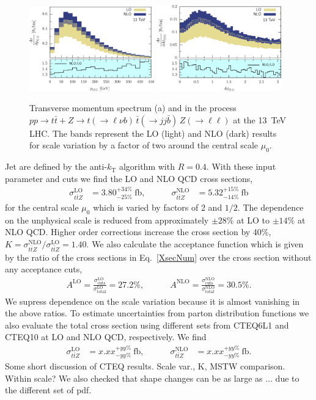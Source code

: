 \documentclass[preprint]{JHEP3} %
\def\ttb{t\bar{t}}
\newcommand{\be}{\begin{eqnarray}}
\newcommand{\ee}{\end{eqnarray}}
\begin{document}
\begin{figure}[t]
\centering %
\includegraphics[width=0.48\textwidth]{./LHC_53_Fig12.eps}
\includegraphics[width=0.48\textwidth]{./LHC_53_Fig17.eps}
\caption{\label{fig:i} Transverse momentum spectrum (a) and 
in the process $pp \to \ttb + Z \to t(\to \ell \nu b) \, \bar{t} (\to jj \bar{b}) \, Z(\to \ell \ell)$ at the 13~TeV LHC.
The bands represent the LO (light) and NLO (dark) results for scale variation by a factor of two around the central scale $\mu_0$.
}
\end{figure}
Jet are defined by the anti-$k_\mathrm{T}$ algorithm \cite{Cacciari:2008gp} with $R=0.4$.
With these input parameter and cuts we find the LO and NLO QCD cross sections,
\be
\label{XsecNum}
  \sigma_{\ttb Z}^\mathrm{LO} &= 3.80^{+34\%}_{-25\%}~\mathrm{fb},
  \quad\quad\quad
  \sigma_{\ttb Z}^\mathrm{NLO} &= 5.32^{+15\%}_{-14\%}~\mathrm{fb}
\ee
for the central scale $\mu_0$ which is varied by factors of 2 and $1/2$.
The dependence on the unphysical scale is reduced from approximately $\pm 28\%$ at LO to $\pm 14\%$ at NLO QCD.
Higher order corrections increase the cross section by 40\%, $K= \sigma_{\ttb Z}^\mathrm{NLO} \big/  \sigma_{\ttb Z}^\mathrm{LO}=1.40$.
We also calculate the acceptance function which is given by the ratio of the cross sections in Eq.~\ref{XsecNum} over the 
cross section without any acceptance cuts, 
\be
  A^\mathrm{LO} = \frac{\sigma_{\mathrm{cuts}}^\mathrm{LO}}{\sigma_{\mathrm{total}}^\mathrm{LO}} = 27.2 \% ,
  \quad\quad\quad
  A^\mathrm{NLO} = \frac{\sigma_{\mathrm{cuts}}^\mathrm{NLO}}{\sigma_{\mathrm{total}}^\mathrm{NLO}} = 30.5 \%.
\ee
We supress dependence on the scale variation because it is almost vanishing in the above ratios.
To estimate uncertainties from parton distribution functions we also evaluate the total cross section
using different sets from CTEQ6L1 \cite{} and CTEQ10 \cite{} at LO and NLO QCD, respectively. 
We find 
\be
\label{XsecNumCTEQ}
  \sigma_{\ttb Z}^\mathrm{LO} &= x.xx^{+yy\%}_{-yy\%}~\mathrm{fb},
  \quad\quad\quad
  \sigma_{\ttb Z}^\mathrm{NLO} &= x.xx^{+yy\%}_{-yy\%}~\mathrm{fb}.
\ee
Some short discussion of CTEQ results. Scale var., K, MSTW comparison. Within scale?
We also checked that shape changes can be as large as ... due to the different set of pdf.
\end{document}
